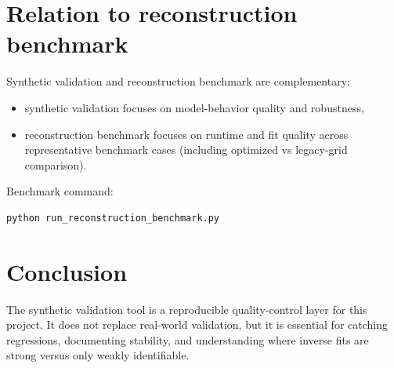 \documentclass[12pt,a4paper]{article}
\begin{document}
\section{Relation to reconstruction benchmark}
Synthetic validation and reconstruction benchmark are complementary:
\begin{itemize}
    \item synthetic validation focuses on model-behavior quality and robustness,
    \item reconstruction benchmark focuses on runtime and fit quality across representative benchmark cases (including optimized vs legacy-grid comparison).
\end{itemize}

Benchmark command:
\begin{verbatim}
python run_reconstruction_benchmark.py
\end{verbatim}

\section{Conclusion}
The synthetic validation tool is a reproducible quality-control layer for this project. It does not replace real-world validation, but it is essential for catching regressions, documenting stability, and understanding where inverse fits are strong versus only weakly identifiable.
\end{document}
